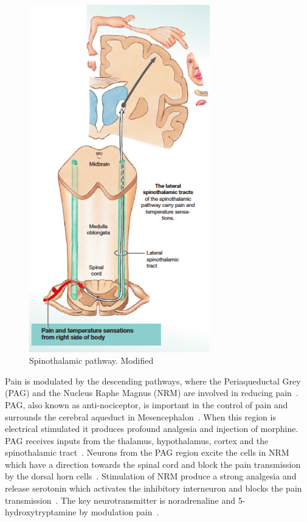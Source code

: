\begin{figure}[H]
	\includegraphics[width=0.7\textwidth]{figures/pathways.png} 
	\caption{Spinothalamic pathway. Modified~\cite{Martini2012}}
	\label{fig:pathways}  
\end{figure}   

Pain is modulated by the descending pathways, where the Periaqueductal Grey (PAG) and the Nucleus Raphe Magnus (NRM) are involved in reducing pain~\cite{Steeds2013}. PAG, also known as anti-nociceptor, is important in the control of pain and surrounds the cerebral aqueduct in Mesencephalon~\cite{Steeds2013}. When this region is electrical stimulated it produces profound analgesia and injection of morphine. PAG receives inputs from the thalamus, hypothalamus, cortex and the spinothalamic tract~\cite{Steeds2013}. Neurons from the PAG region excite the cells in NRM which have a direction towards the spinal cord and block the pain transmission by the dorsal horn cells~\cite{Steeds2013}. Stimulation of NRM produce a strong analgesia and release serotonin which activates the inhibitory interneuron and blocks the pain transmission~\cite{Steeds2013}. The key neurotransmitter is noradrenaline and 5-hydroxytryptamine by modulation pain~\cite{Steeds2013}. 

